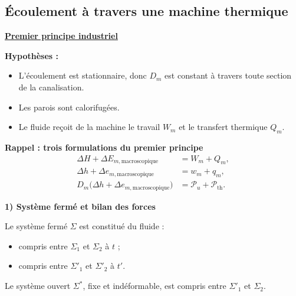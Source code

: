 \documentclass[11pt,a4paper]{article}
\newcommand{\zone}[1]{\tikz[baseline=(z.base)]\node[draw,circle,inner sep=1pt,font=\scriptsize,minimum size=3.5mm](z){#1};}
\newcommand{\titr}[1]{\par\textbf{\underline{#1}}\par\nopagebreak[3]}
\newcommand{\etoiles}[1]{\foreach \i in {1,...,#1}{\mathord{\star}\,}}
\newcommand{\sys}{\Sigma^*}
\newcommand{\etape}[1]{\par\medskip\textbf{#1}\par\nopagebreak[4]}
\begin{document}
\subsection{Écoulement à travers une machine thermique}
\titr{Premier principe industriel}
\begin{center}\end{center}
\par\textbf{Hypothèses :}
\begin{itemize}
\item L'écoulement est stationnaire, donc $D_m$ est constant à travers toute section de la canalisation.
\item Les parois sont calorifugées.
\item Le fluide reçoit de la machine le travail $W_m$ et le transfert thermique $Q_m$.
\end{itemize}
\begin{cadre}[etoiles={\etoiles{5}}]
\textbf{Rappel : trois formulations du premier principe}
\begin{align*}
\Delta H+\Delta E_{m,\mathrm{macroscopique}}&=W_m+Q_m,\\
\Delta h+\Delta e_{m,\mathrm{macroscopique}}&=w_m+q_m,\\
D_m\bigl(\Delta h+\Delta e_{m,\mathrm{macroscopique}}\bigr)&=\mathcal P_u+\mathcal P_{\mathrm{th}}.
\end{align*}
\end{cadre}
\etape{1) Système fermé et bilan des forces}
Le système fermé $\Sigma$ est constitué du fluide :
\begin{itemize}\item compris entre $\Sigma_1$ et $\Sigma_2$ à $t$ ;\item compris entre $\Sigma'_1$ et $\Sigma'_2$ à $t'$.\end{itemize}
\par Le système ouvert $\sys$, fixe et indéformable, est compris entre $\Sigma'_1$ et $\Sigma_2$.
\end{document}
